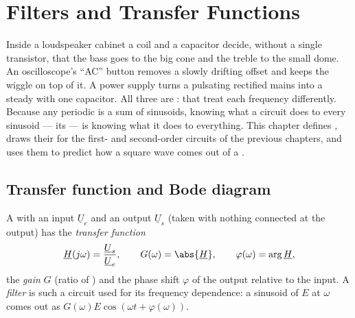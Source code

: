 \chapter{Filters and Transfer Functions}\label{ch:b1:filters-transfer-functions}

Inside a loudspeaker cabinet a coil and a capacitor decide, without a
single transistor, that the bass goes to the big cone and the treble to
the small dome. An oscilloscope's ``AC'' button removes a slowly
drifting offset and keeps the wiggle on top of it. A power supply turns
a pulsating rectified mains into a steady  with one capacitor.
All three are \emph{}:  that treat each frequency
differently. Because any periodic  is a sum of sinusoids, knowing
what a circuit does to every sinusoid --- its  --- is
knowing what it does to everything. This chapter defines , draws their  for the first- and second-order
circuits of the previous chapters, and uses them to predict how a
square wave comes out of a .

\section{Transfer function and Bode diagram}

\begin{definition}\label{def:b1:filters-transfer-functions:H}
A  with an input  $\underline U_e$ and an output
 $\underline U_s$ (taken with nothing connected at the output) has
the \emph{transfer function}
\[
\underline H(j\omega) = \frac{\underline U_s}{\underline U_e},
\qquad G(\omega) = \abs{\underline H}, \qquad \varphi(\omega) = \arg\underline H,
\]
the \emph{gain} $G$ (ratio of ) and the phase shift $\varphi$
of the output relative to the input. A \emph{filter} is such a circuit
used for its frequency dependence: a sinusoid of  $E$ at
$\omega$ comes out as $G(\omega)E\cos(\omega t + \varphi(\omega))$.
\end{definition}

